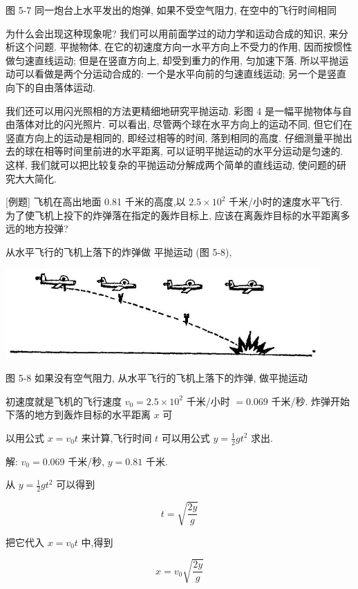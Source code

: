 \documentclass[10pt]{article}
\begin{document}
图 5-7 同一炮台上水平发出的炮弹, 如果不受空气阻力, 在空中的飞行时间相同

为什么会出现这种现象呢? 我们可以用前面学过的动力学和运动合成的知识, 来分析这个问题. 平抛物体, 在它的初速度方向一水平方向上不受力的作用, 因而按惯性做匀速直线运动; 但是在竖直方向上, 却受到重力的作用, 匀加速下落. 所以平抛运动可以看做是两个分运动合成的: 一个是水平向前的匀速直线运动; 另一个是竖直向下的自由落体运动.

我们还可以用闪光照相的方法更精细地研究平抛运动. 彩图 4 是一幅平抛物体与自由落体对比的闪光照片. 可以看出, 尽管两个球在水平方向上的运动不同, 但它们在竖直方向上的运动是相同的, 即经过相等的时间, 落到相同的高度. 仔细测量平抛出去的球在相等时间里前进的水平距离, 可以证明平抛运动的水平分运动是匀速的. 这样, 我们就可以把比较复杂的平抛运动分解成两个简单的直线运动, 使问题的研究大大简化.

[例题] 飞机在高出地面 0.81 千米的高度,以 \({2.5} \times {10}^{2}\) 千米/小时的速度水平飞行. 为了使飞机上投下的炸弹落在指定的轰炸目标上, 应该在离轰炸目标的水平距离多远的地方投弹?

从水平飞行的飞机上落下的炸弹做 平抛运动 (图 5-8),

\begin{center}
\includegraphics[max width=0.9\textwidth]{images/01912d55-147c-70aa-b0e0-1782a122f948_135_574458.jpg}
\end{center}

图 5-8 如果没有空气阻力, 从水平飞行的飞机上落下的炸弹, 做平抛运动

初速度就是飞机的飞行速度 \({v}_{0} = {2.5} \times {10}^{2}\) 千米/小时 \(= {0.069}\) 千米/秒. 炸弹开始下落的地方到轰炸目标的水平距离 \(x\) 可

以用公式 \(x = {v}_{0}t\) 来计算,飞行时间 \(t\) 可以用公式 \(y = \frac{1}{2}g{t}^{2}\) 求出.

解: \({v}_{0} = {0.069}\) 千米/秒, \(y = {0.81}\) 千米.

从 \(y = \frac{1}{2}g{t}^{2}\) 可以得到

\[
t = \sqrt{\frac{2y}{g}}
\]

把它代入 \(x = {v}_{0}t\) 中,得到

\[
x = {v}_{0}\sqrt{\frac{2y}{g}}
\]
\end{document}
